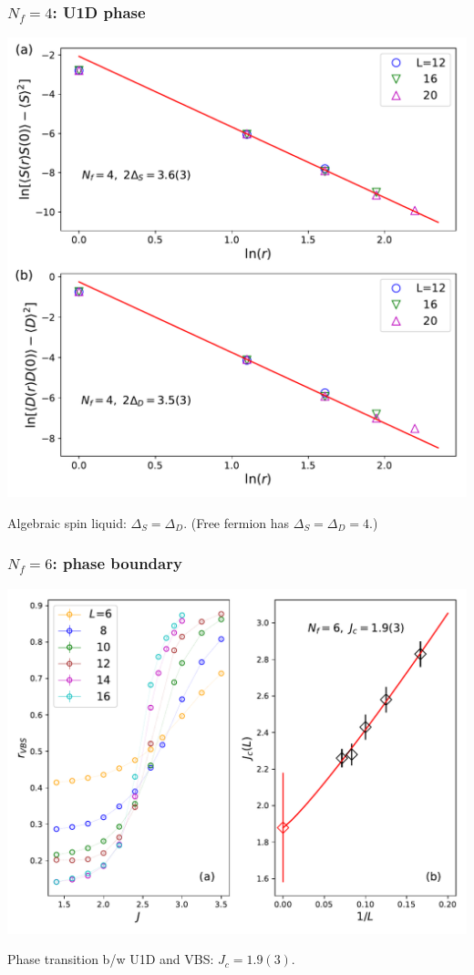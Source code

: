 \documentclass[xcolor=table, 10pt, aspectratio=43]{beamer}
\begin{document}
\begin{frame}
  \frametitle{$N_f=4$: U1D phase}
  \begin{center}
    \includegraphics[width=.5\textwidth]{n4decay}
  \end{center}
  Algebraic spin liquid: $\Delta_S = \Delta_D$.
  (Free fermion has $\Delta_S=\Delta_D = 4$.)
\end{frame}

\begin{frame}
  \frametitle{$N_f=6$: phase boundary}
  \begin{center}
    \includegraphics[width=.8\textwidth]{n6rvbs}
  \end{center}
  Phase transition b/w U1D and VBS: $J_c=1.9(3)$.
\end{frame}
\end{document}

